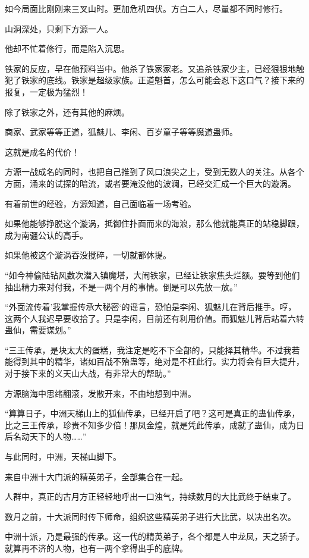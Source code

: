 \begin{this_body}
如今局面比刚刚来三叉山时。更加危机四伏。方白二人，尽量都不同时修行。

山洞深处，只剩下方源一人。

他却不忙着修行，而是陷入沉思。

铁家的反应，早在他预料当中。他杀了铁家家老。又追杀铁家少主，已经狠狠地触犯了铁家的底线。铁家是超级家族。正道魁首，怎么可能会忍下这口气？接下来的报复，一定极为猛烈！

除了铁家之外，还有其他的麻烦。

商家、武家等等正道，狐魅儿、李闲、百岁童子等等魔道蛊师。

这就是成名的代价！

方源一战成名的同时，也把自己推到了风口浪尖之上，受到无数人的关注。从各个方面，涌来的试探的暗流，或者要淹没他的波澜，已经交汇成一个巨大的漩涡。

有着前世的经验，方源知道，自己面临着一场考验。

如果他能够挣脱这个漩涡，抵御住扑面而来的海浪，那么他就能真正的站稳脚跟，成为南疆公认的高手。

如果他被这个漩涡吞没搅碎，一切就都休提。

“如今神偷陆钻风数次潜入镇魔塔，大闹铁家，已经让铁家焦头烂额。要等到他们抽出精力来对付我，不是一两个月的事情。倒是可以先放一放。”

“外面流传着’我掌握传承大秘密‘的谣言，恐怕是李闲、狐魅儿在背后推手。哼，这两个人我迟早要收拾了。只是李闲，目前还有利用价值。而狐魅儿背后站着六转蛊仙，需要谋划。”

“三王传承，是块太大的蛋糕，我注定是吃不下全部的，只能择其精华。不过我若能得到其中的精华，诸如百战不殆蛊等，绝对是不枉此行。实力将会有巨大提升，对于接下来的义天山大战，有非常大的帮助。”

方源脑海中思绪翻滚，发散开来，不由地想到中洲。

“算算日子，中洲天梯山上的狐仙传承，已经开启了吧？这可是真正的蛊仙传承，比之三王传承，珍贵不知多少倍！那凤金煌，就是凭此传承，成就了蛊仙，成为日后名动天下的人物……”

与此同时，中洲，天梯山脚下。

来自中洲十大门派的精英弟子，全部集合在一起。

人群中，真正的古月方正轻轻地呼出一口浊气，持续数月的大比武终于结束了。

数月之前，十大派同时传下师命，组织这些精英弟子进行大比武，以决出名次。

中洲十派，乃是最强的传承。这一代的精英弟子，各个都是人中龙凤，天之骄子。就算再不济的人物，也有一两个拿得出手的底牌。


\end{this_body}
